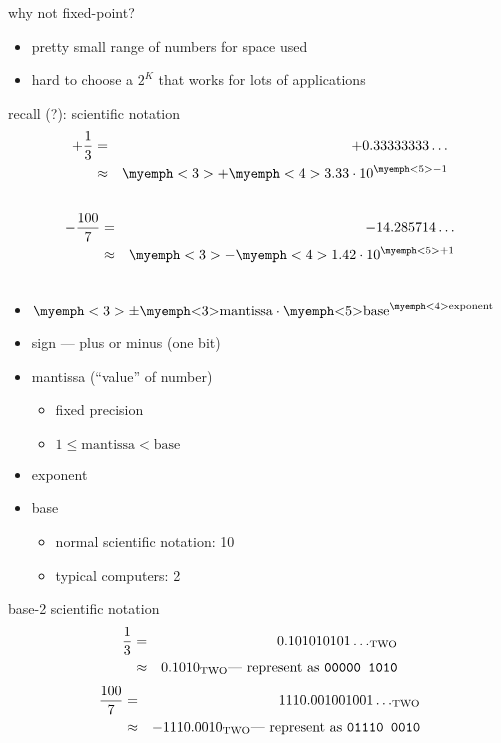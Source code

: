 \begin{frame}{why not fixed-point?}
\begin{itemize}
\item pretty small range of numbers for space used
\item hard to choose a $2^K$ that works for lots of applications
\end{itemize}
\end{frame}

\begin{frame}{recall (?): scientific notation}
\begin{eqnarray*}
+\frac{1}{3} &=& +0.33333333\ldots \\
            &\approx& \myemph<3>{+}\myemph<4>{3.33}\cdot 10^{\myemph<5>{-1}} \\\
\end{eqnarray*}
\begin{eqnarray*}
-\frac{100}{7} &=& -14.285714\ldots \\
            &\approx& \myemph<3>{-}\myemph<4>{1.42}\cdot 10^{\myemph<5>{+1}} \\\
\end{eqnarray*}
\begin{itemize}
\item<2-> $\myemph<3>{\pm}\text{\myemph<3>{mantissa}} \cdot \text{\myemph<5>{base}}^\text{\myemph<4>{exponent}}$
\item<3-> sign --- plus or minus (one bit)
\item<4-> mantissa (``value'' of number)
    \begin{itemize}
    \item fixed precision
    \item $1 \le \text{mantissa} < \text{base}$
    \end{itemize}
\item<5-> exponent
\item<6-> base
    \begin{itemize}
    \item normal scientific notation: 10
    \item typical computers: 2
    \end{itemize}
\end{itemize}
\end{frame}

\begin{frame}{base-2 scientific notation}
\begin{eqnarray*}
\frac{1}{3} &=& 0.101010101\ldots_\text{TWO}  \\\
            &\approx& 0.1010_\text{TWO} \text{--- represent as {\tt 00000 1010}} \\
\end{eqnarray*}
\begin{eqnarray*}
\frac{100}{7} &=& 1110.001001001\ldots_\text{TWO}  \\\
            &\approx& -1110.0010_\text{TWO} \text{--- represent as {\tt 01110 0010}} \\
\end{eqnarray*}
\end{frame}
